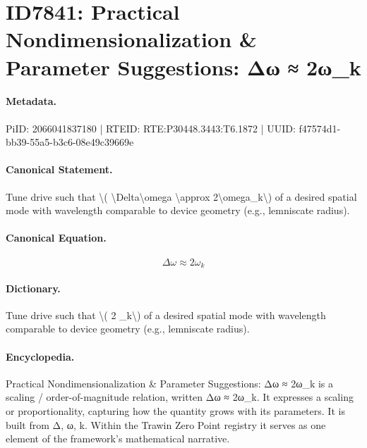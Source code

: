 \section*{ID7841: Practical Nondimensionalization \& Parameter Suggestions: Δω ≈ 2ω\_k}
\paragraph{Metadata.}
PiID: 2066041837180 | RTEID: RTE:P30448.3443:T6.1872 | UUID: f47574d1-bb39-55a5-b3c6-08e49c39669e

\paragraph{Canonical Statement.}
Tune drive such that \textbackslash{}( \textbackslash{}Delta\textbackslash{}omega \textbackslash{}approx 2\textbackslash{}omega\_k\textbackslash{}) of a desired spatial mode with wavelength comparable to device geometry (e.g., lemniscate radius).

\paragraph{Canonical Equation.}
\[
\Delta\omega \approx 2\omega_k
\]

\paragraph{Dictionary.}
Tune drive such that \textbackslash{}( 2 \_k\textbackslash{}) of a desired spatial mode with wavelength comparable to device geometry (e.g., lemniscate radius).

\paragraph{Encyclopedia.}
Practical Nondimensionalization \& Parameter Suggestions: Δω ≈ 2ω\_k is a scaling / order-of-magnitude relation, written Δω ≈ 2ω\_k. It expresses a scaling or proportionality, capturing how the quantity grows with its parameters. It is built from Δ, ω, k. Within the Trawin Zero Point registry it serves as one element of the framework's mathematical narrative.
